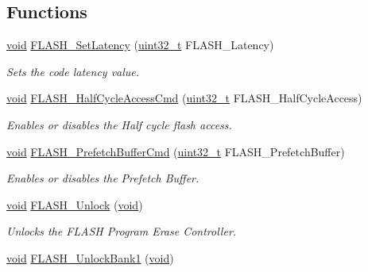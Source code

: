 \subsection*{Functions}
\begin{DoxyCompactItemize}
\item 
\hyperlink{usb__devapi_8h_afabf60e7f57651d6d595a02c75f07cd0}{void} \hyperlink{group___f_l_a_s_h___private___functions_ga54bcb96270215c752c3479c8c9e438c0}{F\+L\+A\+S\+H\+\_\+\+Set\+Latency} (\hyperlink{_p_e___types_8h_a33594304e786b158f3fb30289278f5af}{uint32\+\_\+t} F\+L\+A\+S\+H\+\_\+\+Latency)
\begin{DoxyCompactList}\small\item\em Sets the code latency value. \end{DoxyCompactList}\item 
\hyperlink{usb__devapi_8h_afabf60e7f57651d6d595a02c75f07cd0}{void} \hyperlink{group___f_l_a_s_h___private___functions_ga978103a57b37920ac01128e999f9ece6}{F\+L\+A\+S\+H\+\_\+\+Half\+Cycle\+Access\+Cmd} (\hyperlink{_p_e___types_8h_a33594304e786b158f3fb30289278f5af}{uint32\+\_\+t} F\+L\+A\+S\+H\+\_\+\+Half\+Cycle\+Access)
\begin{DoxyCompactList}\small\item\em Enables or disables the Half cycle flash access. \end{DoxyCompactList}\item 
\hyperlink{usb__devapi_8h_afabf60e7f57651d6d595a02c75f07cd0}{void} \hyperlink{group___f_l_a_s_h___private___functions_ga6b93faaf0f560bf8d662b2cefe2f70e8}{F\+L\+A\+S\+H\+\_\+\+Prefetch\+Buffer\+Cmd} (\hyperlink{_p_e___types_8h_a33594304e786b158f3fb30289278f5af}{uint32\+\_\+t} F\+L\+A\+S\+H\+\_\+\+Prefetch\+Buffer)
\begin{DoxyCompactList}\small\item\em Enables or disables the Prefetch Buffer. \end{DoxyCompactList}\item 
\hyperlink{usb__devapi_8h_afabf60e7f57651d6d595a02c75f07cd0}{void} \hyperlink{group___f_l_a_s_h___private___functions_ga4084d0184bab463a1579271bf474aaef}{F\+L\+A\+S\+H\+\_\+\+Unlock} (\hyperlink{usb__devapi_8h_afabf60e7f57651d6d595a02c75f07cd0}{void})
\begin{DoxyCompactList}\small\item\em Unlocks the F\+L\+A\+SH Program Erase Controller. \end{DoxyCompactList}\item 
\hyperlink{usb__devapi_8h_afabf60e7f57651d6d595a02c75f07cd0}{void} \hyperlink{group___f_l_a_s_h___private___functions_ga358c4b7e0ef20693ca62cc9d20c94a5a}{F\+L\+A\+S\+H\+\_\+\+Unlock\+Bank1} (\hyperlink{usb__devapi_8h_afabf60e7f57651d6d595a02c75f07cd0}{void})

\end{DoxyCompactItemize}
